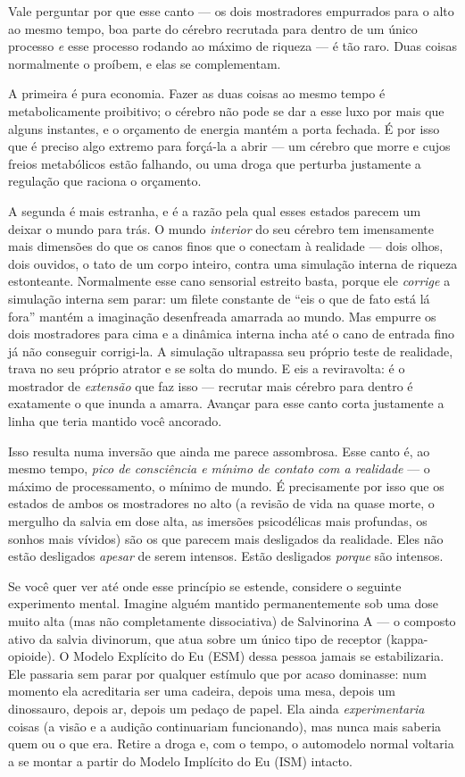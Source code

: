 \documentclass[11pt, twoside, openright]{book}
\begin{document}
Vale perguntar por que esse canto --- os dois mostradores empurrados para o alto ao mesmo tempo, boa parte do cérebro recrutada para dentro de um único processo \textit{e} esse processo rodando ao máximo de riqueza --- é tão raro. Duas coisas normalmente o proíbem, e elas se complementam.

A primeira é pura economia. Fazer as duas coisas ao mesmo tempo é metabolicamente proibitivo; o cérebro não pode se dar a esse luxo por mais que alguns instantes, e o orçamento de energia mantém a porta fechada. É por isso que é preciso algo extremo para forçá-la a abrir --- um cérebro que morre e cujos freios metabólicos estão falhando, ou uma droga que perturba justamente a regulação que raciona o orçamento.

A segunda é mais estranha, e é a razão pela qual esses estados parecem um deixar o mundo para trás. O mundo \textit{interior} do seu cérebro tem imensamente mais dimensões do que os canos finos que o conectam à realidade --- dois olhos, dois ouvidos, o tato de um corpo inteiro, contra uma simulação interna de riqueza estonteante. Normalmente esse cano sensorial estreito basta, porque ele \textit{corrige} a simulação interna sem parar: um filete constante de ``eis o que de fato está lá fora'' mantém a imaginação desenfreada amarrada ao mundo. Mas empurre os dois mostradores para cima e a dinâmica interna incha até o cano de entrada fino já não conseguir corrigi-la. A simulação ultrapassa seu próprio teste de realidade, trava no seu próprio atrator e se solta do mundo. E eis a reviravolta: é o mostrador de \textit{extensão} que faz isso --- recrutar mais cérebro para dentro é exatamente o que inunda a amarra. Avançar para esse canto corta justamente a linha que teria mantido você ancorado.

Isso resulta numa inversão que ainda me parece assombrosa. Esse canto é, ao mesmo tempo, \textit{pico de consciência e mínimo de contato com a realidade} --- o máximo de processamento, o mínimo de mundo. É precisamente por isso que os estados de ambos os mostradores no alto (a revisão de vida na quase morte, o mergulho da salvia em dose alta, as imersões psicodélicas mais profundas, os sonhos mais vívidos) são os que parecem mais desligados da realidade. Eles não estão desligados \textit{apesar} de serem intensos. Estão desligados \textit{porque} são intensos.

Se você quer ver até onde esse princípio se estende, considere o seguinte experimento mental. Imagine alguém mantido permanentemente sob uma dose muito alta (mas não completamente dissociativa) de Salvinorina A --- o composto ativo da salvia divinorum, que atua sobre um único tipo de receptor (kappa-opioide). O Modelo Explícito do Eu (ESM) dessa pessoa jamais se estabilizaria. Ele passaria sem parar por qualquer estímulo que por acaso dominasse: num momento ela acreditaria ser uma cadeira, depois uma mesa, depois um dinossauro, depois ar, depois um pedaço de papel. Ela ainda \textit{experimentaria} coisas (a visão e a audição continuariam funcionando), mas nunca mais saberia quem ou o que era. Retire a droga e, com o tempo, o automodelo normal voltaria a se montar a partir do Modelo Implícito do Eu (ISM) intacto.
\end{document}
